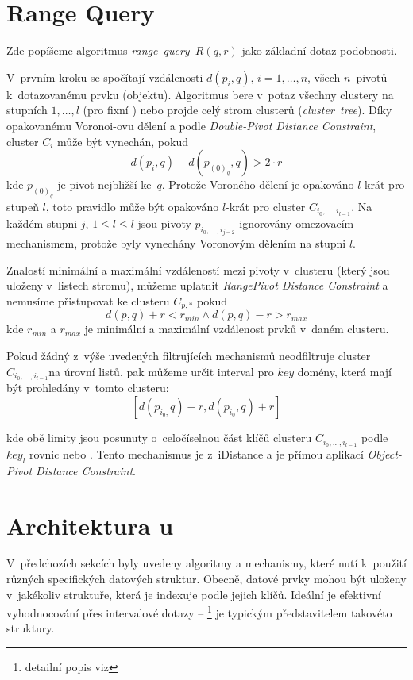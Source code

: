 \section{Range Query\label{sec:Range-Query}}

Zde popíšeme algoritmus \emph{range~query~}$R(q,r)$ jako základní
dotaz podobnosti.

V~prvním kroku se spočítají vzdálenosti $d(p_{i},q),\, i=1,\ldots,n$,
všech $n$~pivotů k~dotazovanému prvku (objektu)\@. Algoritmus
bere v~potaz všechny clustery na stupních $1,\ldots,l$ (pro fixní
\MIndex) nebo projde celý strom clusterů (\emph{cluster~tree})\@.
Díky opakovanému Voronoi-ovu dělení a podle \emph{Double-Pivot Distance
Constraint}\cite{similaritysearch2006}, cluster $C_{i}$ může být
vynechán, pokud
\[
d(p_{i},q)-d(p_{(0)_{q}},q)>2\cdot r
\]
kde $p_{(0)_{q}}$ je pivot nejbližší ke~$q$\@. Protože Voroného
dělení je opakováno $l$-krát pro stupeň $l$, toto pravidlo může
být opakováno $l$-krát pro cluster $C_{i_{0},\ldots,i_{l-1}}$\@.
Na každém stupni $j,\,1\leq l\leq l$ jsou pivoty $p_{i_{0},\ldots,i_{j-2}}$
ignorovány omezovacím mechanismem, protože byly vynechány Voronovým
dělením na stupni $l$\@.

Znalostí minimální a maximální vzdáleností mezi pivoty v~clusteru
(který jsou uloženy v~listech stromu), můžeme uplatnit \emph{RangePivot
Distance Constraint}\cite{similaritysearch2006} a nemusíme přistupovat
ke clusteru $C_{p,*}$ pokud
\[
d(p,q)+r<r_{min} \wedge d(p,q)-r>r_{max}
\]
kde $r_{min}$ a $r_{max}$ je minimální a maximální vzdálenost prvků
v~daném clusteru\@.

Pokud žádný z~výše uvedených filtrujících mechanismů neodfiltruje
cluster $C_{i_{0},\ldots,i_{l-1}}$na úrovní listů, pak můžeme určit
interval pro $key$ domény, která mají být prohledány v~tomto clusteru:
\[
[d(p_{i_{0},}q)-r,d(p_{i_{0}},q)+r]
\]

kde obě limity jsou posunuty o~celočíselnou část klíčů clusteru $C_{i_{0},\ldots,i_{l-1}}$ podle
$key_{l}$ rovnic  nebo .
Tento mechanismus je  \linebreak z~iDistance a je přímou aplikací
\emph{Object-Pivot Distance Constraint}\cite{similaritysearch2006}\@.

\section{Architektura \MIndex u}

V~předchozích sekcích byly uvedeny algoritmy a mechanismy, které
nutí k~použití různých specifických datových struktur\@. Obecně,
datové prvky mohou být uloženy v~jakékoliv struktuře, která je indexuje
podle jejich \MIndex klíčů. Ideální je efektivní vyhodnocování přes
intervalové dotazy -- \BPTree{}\cite{Cormen:2001:IA:580470}%
\footnote{detailní popis \BPTree{} viz %
} je typickým představitelem takovéto struktury\@.

